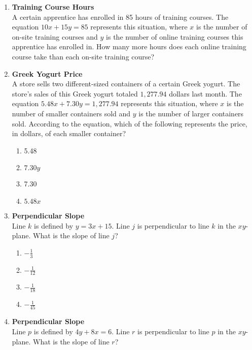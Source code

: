 \begin{enumerate}
\item \textbf{Training Course Hours}\\
A certain apprentice has enrolled in 85 hours of training courses. The equation $10x + 15y = 85$ represents this situation, where $x$ is the number of on-site training courses and $y$ is the number of online training courses this apprentice has enrolled in. How many more hours does each online training course take than each on-site training course?
\begin{subanswer}
\end{subanswer}

\item \textbf{Greek Yogurt Price}\\
A store sells two different-sized containers of a certain Greek yogurt. The store's sales of this Greek yogurt totaled $1,277.94$ dollars last month. The equation $5.48x + 7.30y = 1,277.94$ represents this situation, where $x$ is the number of smaller containers sold and $y$ is the number of larger containers sold. According to the equation, which of the following represents the price, in dollars, of each smaller container?
\begin{enumerate}[label=(\Alph*)]
  \item 5.48
  \item $7.30y$
  \item 7.30
  \item $5.48x$
\end{enumerate}
\begin{subanswer}
\end{subanswer}

\item \textbf{Perpendicular Slope}\\
Line $k$ is defined by $y = 3x + 15$. Line $j$ is perpendicular to line $k$ in the $xy$-plane. What is the slope of line $j$?
\begin{enumerate}[label=(\Alph*)]
  \item $-\frac{1}{3}$
  \item $-\frac{1}{12}$
  \item $-\frac{1}{18}$
  \item $-\frac{1}{45}$
\end{enumerate}
\begin{subanswer}
\end{subanswer}

\item \textbf{Perpendicular Slope}\\
Line $p$ is defined by $4y + 8x = 6$. Line $r$ is perpendicular to line $p$ in the $xy$-plane. What is the slope of line $r$?
\begin{subanswer}
\end{subanswer}


\end{enumerate}
